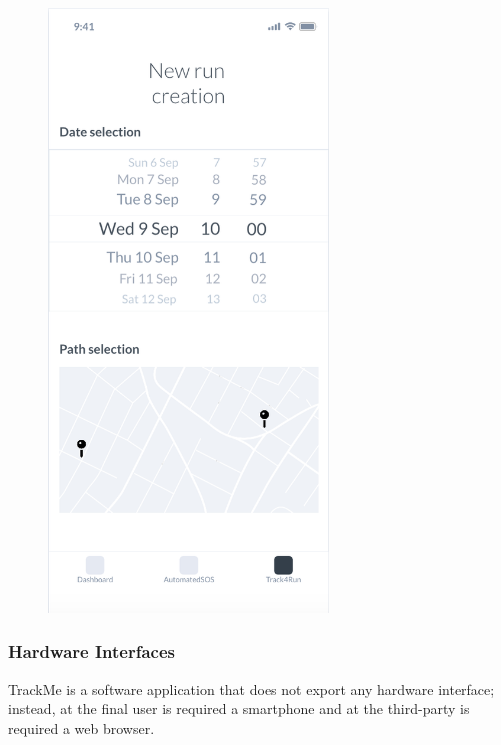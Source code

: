 \documentclass{article}
\begin{document}
	\begin{figure}[!h]
	 	\centering
		\includegraphics[height=16cm,keepaspectratio]{Figures/8Path}
	\end{figure}\newpage	
	
	\newpage
	\subsubsection{Hardware Interfaces}
	TrackMe is a software application that does not export any 
	hardware interface; instead, at the final user is required a 
	smartphone and at the third-party is required a web browser. 
			
\end{document}
